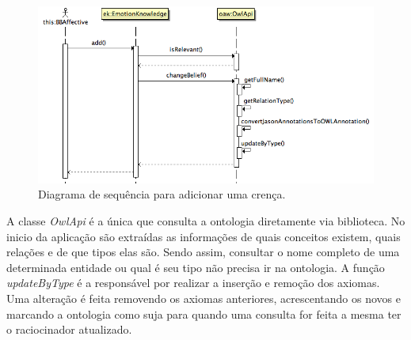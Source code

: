\begin{figure}
  \centering
  \includegraphics[width=12cm]{figuras/shareBelief.png}
  \caption{Diagrama de sequência para adicionar uma crença.}
  \label{fig:shareBelief}
\end{figure}

A classe \emph{OwlApi} é a única que consulta a ontologia diretamente via
biblioteca. No inicio da aplicação são extraídas as informações de quais
conceitos existem, quais relações e de que tipos elas são. Sendo assim,
consultar o nome completo de uma determinada entidade ou qual é seu tipo não
precisa ir na ontologia. A função \emph{updateByType} é a responsável por
realizar a inserção e remoção dos axiomas. Uma alteração é feita removendo
os axiomas anteriores, acrescentando os novos e marcando a ontologia como suja
para quando uma consulta for feita a mesma ter o raciocinador atualizado.

